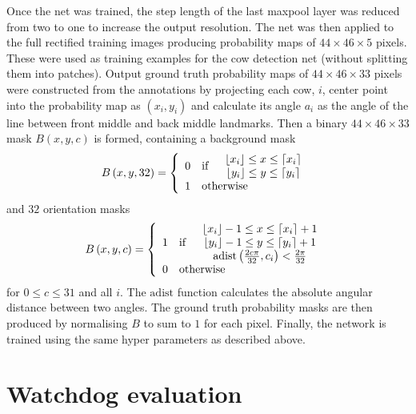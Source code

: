 \documentclass{cta-author}
\begin{document}
Once the net was trained, the step length of the last maxpool layer was reduced from two to one to increase the output resolution. The net was then applied to the full rectified training images producing probability maps of $44\times 46\times 5$ pixels. These were used as training examples for the cow detection net (without splitting them into patches). Output ground truth probability maps of $44\times 46\times 33$ pixels were constructed from the annotations by projecting each cow, $i$, center point into the probability map as $\left( x_i, y_i \right)$ and calculate its angle $a_i$ as the angle of the line between front middle and back middle landmarks. Then a binary $44\times 46\times 33$ mask $B\left( x, y, c \right)$ is formed, containing a background mask
\begin{equation}
B\left( x, y, 32 \right) = \left\lbrace
\begin{array}{clc}
0 & \text{if} &
\begin{array}{c}
 \lfloor x_i \rfloor \leq x \leq \lceil x_i \rceil \\
 \lfloor y_i \rfloor \leq y \leq \lceil y_i \rceil
\end{array}
\\
1 & \multicolumn{2}{l}{\text{otherwise}}
\end{array}
\right.
\end{equation}
and $32$ orientation masks
\begin{equation}
B\left( x, y, c \right) = \left\lbrace
\begin{array}{clc}
1 & \text{if} &
\begin{array}{c}
 \lfloor x_i \rfloor-1 \leq x \leq \lceil x_i \rceil+1 \\
 \lfloor y_i \rfloor-1 \leq y \leq \lceil y_i \rceil+1 \\
 \mathrm{adist}\left(\frac{2c\pi}{32}, c_i\right) < \frac{2\pi}{32} \\
\end{array}
\\
0 & \multicolumn{2}{l}{\text{otherwise}}
\end{array}
\right.
\end{equation}
for $0\leq c \leq 31$ and all $i$. The $\mathrm{adist}$ function calculates the absolute angular distance between two angles. The ground truth probability masks are then produced by normalising $B$ to sum to $1$ for each pixel. Finally, the network is trained using the same hyper parameters as described above.

\section{Watchdog evaluation}
\end{document}
